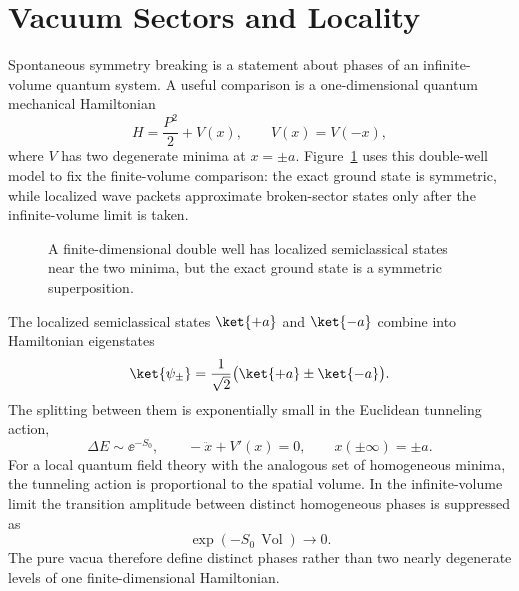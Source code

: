 \section{Vacuum Sectors and Locality}

Spontaneous symmetry breaking is a statement about phases of an infinite-volume
quantum system.  A useful comparison is a one-dimensional quantum mechanical
Hamiltonian
\[
  H=\frac{P^2}{2}+V(x),
  \qquad
  V(x)=V(-x),
\]
where \(V\) has two degenerate minima at \(x=\pm a\).
Figure~\ref{fig:double-well-finite-volume} uses this double-well model to fix
the finite-volume comparison: the exact ground state is symmetric, while
localized wave packets approximate broken-sector states only after the
infinite-volume limit is taken.
\begin{figure}[H]
  \centering
  \caption{A finite-dimensional double well has localized semiclassical states
  near the two minima, but the exact ground state is a symmetric
  superposition.}
  \label{fig:double-well-finite-volume}
\end{figure}
The localized semiclassical states \(\ket{+a}\) and \(\ket{-a}\) combine into
Hamiltonian eigenstates
\[
  \ket{\psi_\pm}
  =
  \frac1{\sqrt2}\bigl(\ket{+a}\pm\ket{-a}\bigr).
\]
The splitting between them is exponentially small in the Euclidean tunneling
action,
\[
  \Delta E\sim \ee^{-S_0},
  \qquad
  -\ddot x+V'(x)=0,
  \qquad
  x(\pm\infty)=\pm a .
\]
For a local quantum field theory with the analogous set of homogeneous
minima, the tunneling action is proportional to the spatial volume.  In the
infinite-volume limit the transition amplitude between distinct homogeneous
phases is suppressed as
\[
  \exp(-S_0\,\operatorname{Vol})
  \longrightarrow 0 .
\]
The pure vacua therefore define distinct phases rather than two nearly
degenerate levels of one finite-dimensional Hamiltonian.

